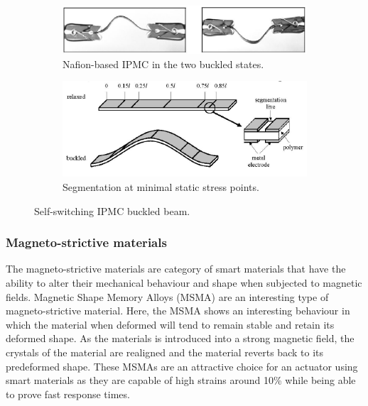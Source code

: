 \begin{figure}[H]
    \centering
    \begin{subfigure}[t]{0.5\textwidth}
			\includegraphics[width=\textwidth]{Figures/IPMC_buckle.png}
			\caption{Nafion-based IPMC in the two buckled states.}
			\label{fig:IPMC_buckle}
    \end{subfigure}

    \begin{subfigure}[t]{0.6\textwidth}
			\includegraphics[width=\textwidth]{Figures/IPMC_segment.png}
			\caption{Segmentation at minimal static stress points.}
			\label{fig:IPMC_segment}
    \end{subfigure}
		\caption{Self-switching IPMC buckled beam\cite{rossiter_self-switching_2006}.}
		\label{fig:IPMC_work}
\end{figure}

\subsubsection{Magneto-strictive materials}
The magneto-strictive materials are category of smart materials that have the ability to alter their mechanical behaviour and shape when subjected to magnetic fields. Magnetic Shape Memory Alloys (MSMA) are an interesting type of magneto-strictive material. Here, the MSMA shows an interesting behaviour in which the material when deformed will tend to remain stable and retain its deformed shape. As the materials is introduced into a strong magnetic field, the crystals of the material are realigned and the material reverts back to its predeformed shape. These MSMAs are an attractive choice for an actuator using smart materials as they are capable of high strains around 10\% while being able to prove fast response times\cite{faran_ferromagnetic_2016}.

